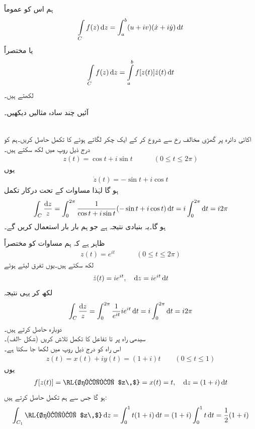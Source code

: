 ہم اس کو عموماً
\begin{align*}
\int\limits_C f(z)\dif z=\int_a^b (u+iv)(\dot{x}+i\dot{y})\dif t
\end{align*}
یا مختصراً
\begin{align}\label{مساوات_مخلوط_تکمل_راہ_ج}
\int\limits_C f(z)\dif z=\int\limits_a^b f[z(t)]\dot{z}(t)\dif t
\end{align}
لکھتے ہیں۔

آئیں چند سادہ مثالیں دیکھیں۔

\quad {}\\
اکائی دائرہ  پر گھڑی مخالف  رخ  سے شروع کر کے ایک چکر لگاتے ہوئے  کا تکمل حاصل کریں۔ہم  کو درج ذیل روپ میں لکھ سکتے ہیں۔
\begin{align}\label{مساوات_مخلوط_تکمل_اکائی_رداس_الف}
z(t)=\cos t+i\sin t\quad \quad \quad (0\le t\le 2\pi)
\end{align}
یوں
\begin{align*}
\dot{z}(t)=-\sin t+i\cos t
\end{align*}
ہو گا لہٰذا مساوات  کے تحت درکار تکمل
\begin{align*}
\int_C\frac{\dif z}{z}=\int_0^{2\pi} \frac{1}{\cos t+i\sin t} (-\sin t+i\cos t)\dif t=i\int_0^{2\pi} \dif t=i2\pi
\end{align*}
ہو گا۔یہ بنیادی نتیجہ ہے جو ہم بار بار استعمال کریں گے۔

ظاہر ہے کہ ہم مساوات  کو مختصراً
\begin{align}\label{مساوات_مخلوط_تکمل_اکائی_رداس_ب}
z(t)=e^{it}\quad \quad \quad (0\le t\le 2\pi)
\end{align}
لکھ سکتے ہیں۔یوں تفرق لیتے ہوئے
\begin{align*}
\dot{z}(t)=ie^{it},\quad \dif z=ie^{it}\dif t
\end{align*}
لکھ کر یہی نتیجہ
\begin{align}
\int_C \frac{\dif z}{z}=\int_0^{2\pi} \frac{1}{e^{it}}ie^{it}\dif t=i\int_0^{2\pi}\dif t=i2\pi
\end{align}
دوبارہ حاصل کرتے ہیں۔ 
\quad {}\\
سیدھی راہ  پر  تا  تفاعل  کا تکمل تلاش کریں 
(شکل -الف)۔\\
اس راہ کو درج ذیل روپ میں لکھا جا سکتا ہے۔
\begin{align*}
z(t)=x(t)+iy(t)=(1+i)t\quad \quad (0\le t\le 1)
\end{align*} 
یوں 
\begin{align*}
f[z(t)]=\text{\RL{حقیقی $z\,$}}=x(t)=t,\quad \dif z=(1+i)\dif t
\end{align*}
ہو گا جس سے ہم تکمل حاصل کرتے ہیں:
\begin{align*}
\int_{C_1} \text{\RL{حقیقی $z\,$}}\dif z=\int_0^1 t(1+i)\dif t=(1+i)\int_0^1 t\dif t=\frac{1}{2}(1+i)
\end{align*}

